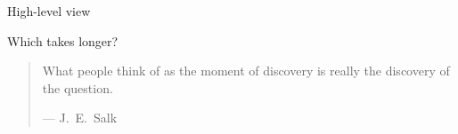 

\subtitle{The Data Science process}



\maketitle

\begin{frame}{High\hyp{}level view}
\end{frame}

\begin{frame}
    \begin{center}
        \LARGE%
        Which takes longer?
    \end{center}
\end{frame}

\begin{frame}
    \large%
    \begin{quote}
        What people think of as the moment of discovery is really the discovery
        of the question.

        \begin{flushright}
            --- J.\ E.\ Salk
        \end{flushright}
    \end{quote}
\end{frame}

